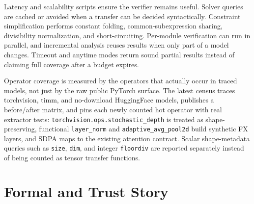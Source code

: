 \documentclass[11pt]{article}
\begin{document}
Latency and scalability scripts ensure the verifier remains useful.  Solver
queries are cached or avoided when a transfer can be decided syntactically.
Constraint simplification performs constant folding, common-subexpression
sharing, divisibility normalization, and short-circuiting.  Per-module
verification can run in parallel, and incremental analysis reuses results when
only part of a model changes.  Timeout and anytime modes return sound partial
results instead of claiming full coverage after a budget expires.

Operator coverage is measured by the operators that actually occur in traced
models, not just by the raw public PyTorch surface.  The latest census traces
torchvision, timm, and no-download HuggingFace models, publishes a before/after
matrix, and pins each newly counted hot operator with real extractor tests:
\texttt{torchvision.ops.stochastic\_depth} is treated as shape-preserving,
functional \texttt{layer\_norm} and \texttt{adaptive\_avg\_pool2d} build
synthetic FX layers, and SDPA maps to the existing attention contract.  Scalar
shape-metadata queries such as \texttt{size}, \texttt{dim}, and integer
\texttt{floordiv} are reported separately instead of being counted as tensor
transfer functions.

\section{Formal and Trust Story}
\end{document}
